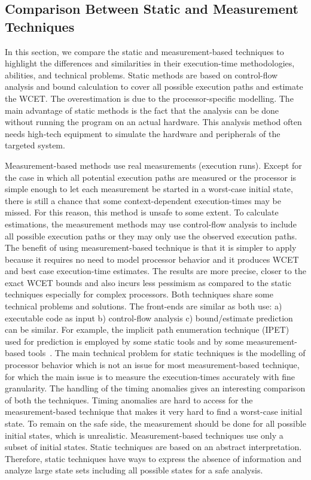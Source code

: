 \subsection{Comparison Between Static and Measurement Techniques}

In this section, we compare the static and measurement-based techniques to highlight the differences and similarities in their execution-time methodologies, abilities, and technical problems. Static methods are based on control-flow analysis and bound calculation to cover all possible execution paths and estimate the WCET. The overestimation is due to the processor-specific modelling. The main advantage of static methods is the fact that the analysis can be done without
running the program on an actual hardware. This analysis method often needs high-tech equipment to simulate the hardware and peripherals of the targeted system. 

Measurement-based methods use real measurements (execution runs). Except for the case in which all potential execution paths are measured or the processor is simple enough to let each measurement be started in a worst-case initial state, there is still a chance that some context-dependent execution-times may be missed. For this reason, this  method is unsafe to some extent. To calculate estimations, the measurement methods may use control-flow analysis to include all possible execution paths or they may only use the observed execution paths. The benefit of using  measurement-based technique is that it is simpler to apply because it requires no need to model processor behavior and it produces WCET and best case execution-time estimates. The results are more precise, closer to the exact WCET bounds and also incurs less pessimism as compared to the static techniques especially for complex processors. 
Both techniques share some technical problems and solutions. The front-ends are similar as both use: a) executable code as input b) control-flow analysis c) bound/estimate prediction can be similar. For example, the implicit path enumeration technique (IPET)~\cite{abella2014comparison} used for prediction is employed by some static tools and by some measurement-based tools~\cite{kosmidis2014pub}.
The main technical problem for static techniques is the modelling of processor behavior which is not an issue for most measurement-based technique, for which the main issue is to measure the execution-times accurately with fine granularity. The handling of the timing anomalies gives an interesting comparison of both the techniques.
Timing anomalies are hard to access for the measurement-based technique that makes it very hard to find a
worst-case initial state. To remain on  the safe side, the measurement should
 be done for all possible initial states, which is unrealistic. 
Measurement-based techniques use only a subset of initial states.
Static techniques are based on an abstract interpretation. Therefore, static techniques have ways to express the absence
of information and analyze large state sets including all possible
states for a safe analysis. 


